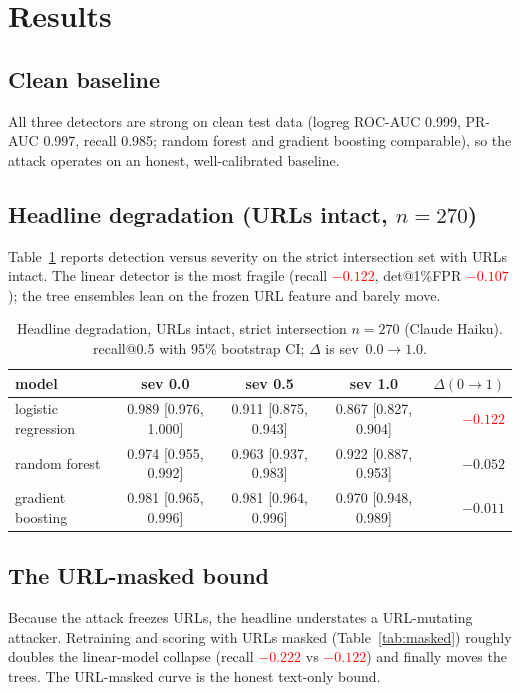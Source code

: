 \documentclass[11pt]{article}
\newcommand{\dropneg}[1]{\textcolor{red}{$-#1$}}
\begin{document}
\section{Results}\label{sec:results}

\subsection{Clean baseline}
All three detectors are strong on clean test data (logreg ROC-AUC 0.999, PR-AUC
0.997, recall 0.985; random forest and gradient boosting comparable), so the attack
operates on an honest, well-calibrated baseline.

\subsection{Headline degradation (URLs intact, \texorpdfstring{$n=270$}{n=270})}
Table~\ref{tab:headline} reports detection versus severity on the strict
intersection set with URLs intact. The linear detector is the most fragile
(recall \dropneg{0.122}, det@1\%FPR \dropneg{0.107}); the tree ensembles lean on
the frozen URL feature and barely move.

\begin{table}[t]
\centering
\caption{Headline degradation, URLs intact, strict intersection $n=270$ (Claude
Haiku). recall@0.5 with 95\% bootstrap CI; $\Delta$ is sev~$0.0\!\to\!1.0$.}
\label{tab:headline}
\begin{tabular}{lcccr}
\toprule
model & sev 0.0 & sev 0.5 & sev 1.0 & $\Delta(0\!\to\!1)$ \\
\midrule
logistic regression & 0.989 [0.976, 1.000] & 0.911 [0.875, 0.943] & 0.867 [0.827, 0.904] & \dropneg{0.122} \\
random forest & 0.974 [0.955, 0.992] & 0.963 [0.937, 0.983] & 0.922 [0.887, 0.953] & $-0.052$ \\
gradient boosting & 0.981 [0.965, 0.996] & 0.981 [0.964, 0.996] & 0.970 [0.948, 0.989] & $-0.011$ \\
\bottomrule
\end{tabular}
\end{table}

\subsection{The URL-masked bound}
Because the attack freezes URLs, the headline understates a URL-mutating attacker.
Retraining and scoring with URLs masked (Table~\ref{tab:masked}) roughly doubles
the linear-model collapse (recall \dropneg{0.222} vs \dropneg{0.122}) and finally
moves the trees. The URL-masked curve is the honest text-only bound.
\end{document}
